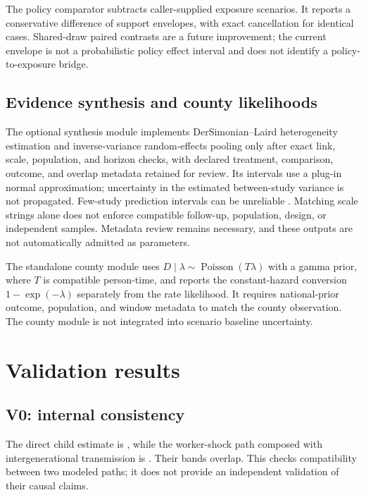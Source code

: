 \documentclass[10pt]{article}
\begin{document}
The policy comparator subtracts caller-supplied exposure scenarios.
It reports a conservative difference of support envelopes, with exact
cancellation for identical cases. Shared-draw paired contrasts are a
future improvement; the current envelope is not a probabilistic policy
effect interval and does not identify a policy-to-exposure bridge.

\subsection{Evidence synthesis and county likelihoods}
The optional synthesis module implements DerSimonian--Laird heterogeneity
estimation and inverse-variance random-effects pooling only after exact
link, scale, population, and horizon checks, with declared treatment,
comparison, outcome, and overlap metadata retained for review. Its intervals use a plug-in normal approximation;
uncertainty in the estimated between-study variance is not propagated.
Few-study prediction intervals can be unreliable \cite{cochraneMeta}.
Matching scale strings alone does not enforce compatible follow-up,
population, design, or independent samples. Metadata review remains
necessary, and these outputs are not automatically admitted as parameters.

The standalone county module uses
$D\mid\lambda\sim\operatorname{Poisson}(T\lambda)$ with a gamma prior,
where $T$ is compatible person-time, and reports the constant-hazard
conversion $1-\exp(-\lambda)$ separately from the rate likelihood. It
requires national-prior outcome, population, and window metadata to match
the county observation. The county module is not integrated into scenario
baseline uncertainty.

\section{Validation results}
\subsection{V0: internal consistency}
The direct child estimate is \VzeroDirect{}, while the worker-shock path
composed with intergenerational transmission is \VzeroComposed{}.
Their bands overlap. This checks compatibility between two modeled paths;
it does not provide an independent validation of their causal claims.
\end{document}
